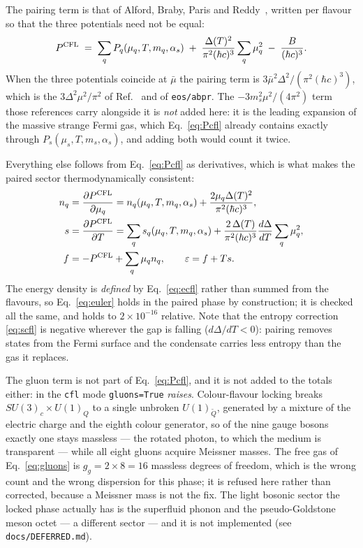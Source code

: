 \documentclass[aps,prc,onecolumn,superscriptaddress,nofootinbib,10pt]{revtex4-2}
\newcommand{\hc}{(\hbar c)^3}
\newcommand{\as}{\alpha_s}
\begin{document}
The pairing term is that of Alford, Braby, Paris and
Reddy~\cite{AlfordBrabyParisReddy2005}, written per flavour so that the three
potentials need not be equal:
%
\begin{equation}
P^{\rm CFL} \;=\; \sum_q P_q(\mu_q, T, m_q, \as)
   \;+\; \frac{\Delta(T)^2}{\pi^2 \hc} \sum_q \mu_q^2
   \;-\; \frac{B}{\hc} .
\label{eq:Pcfl}
\end{equation}
%
When the three potentials coincide at $\bar\mu$ the pairing term is
$3\bar\mu^2\Delta^2/(\pi^2\hc)$, which is the $3\Delta^2\mu^2/\pi^2$ of
Ref.~\cite{AlfordBrabyParisReddy2005} and of \texttt{eos/abpr}. The
$-3 m_s^2 \mu^2/(4\pi^2)$ term those references carry alongside it is
\emph{not} added here: it is the leading expansion of the massive strange
Fermi gas, which Eq.~\eqref{eq:Pcfl} already contains exactly through
$P_s(\mu_s, T, m_s, \as)$, and adding both would count it twice.

Everything else follows from Eq.~\eqref{eq:Pcfl} as derivatives, which is what
makes the paired sector thermodynamically consistent:
%
\begin{align}
n_q &= \frac{\partial P^{\rm CFL}}{\partial \mu_q}
     = n_q(\mu_q, T, m_q, \as)
       + \frac{2 \mu_q \Delta(T)^2}{\pi^2 \hc} ,
\label{eq:ncfl} \\
s &= \frac{\partial P^{\rm CFL}}{\partial T}
   = \sum_q s_q(\mu_q, T, m_q, \as)
     + \frac{2\,\Delta(T)}{\pi^2 \hc} \frac{d\Delta}{dT} \sum_q \mu_q^2 ,
\label{eq:scfl} \\
f &= -P^{\rm CFL} + \sum_q \mu_q n_q , \qquad
\varepsilon = f + T s .
\label{eq:ecfl}
\end{align}
%
The energy density is \emph{defined} by Eq.~\eqref{eq:ecfl} rather than summed
from the flavours, so Eq.~\eqref{eq:euler} holds in the paired phase by
construction; it is checked all the same, and holds to $2\times10^{-16}$
relative. Note that the entropy correction \eqref{eq:scfl} is negative
wherever the gap is falling ($d\Delta/dT < 0$): pairing removes states from
the Fermi surface and the condensate carries less entropy than the gas it
replaces.

The gluon term is not part of Eq.~\eqref{eq:Pcfl}, and it is not added to the
totals either: in the \texttt{cfl} mode \texttt{gluons=True} \emph{raises}.
Colour-flavour locking breaks $SU(3)_c \times U(1)_Q$ to a single unbroken
$U(1)_{\tilde Q}$, generated by a mixture of the electric charge and the
eighth colour generator, so of the nine gauge bosons exactly one stays
massless --- the rotated photon, to which the medium is transparent --- while
all eight gluons acquire Meissner masses. The free gas of
Eq.~\eqref{eq:gluons} is $g_g = 2\times 8 = 16$ massless degrees of freedom,
which is the wrong count and the wrong dispersion for this phase; it is
refused here rather than corrected, because a Meissner mass is not the fix.
The light bosonic sector the locked phase actually has is the superfluid
phonon and the pseudo-Goldstone meson octet --- a different sector --- and it
is not implemented (see \texttt{docs/DEFERRED.md}).
\end{document}
